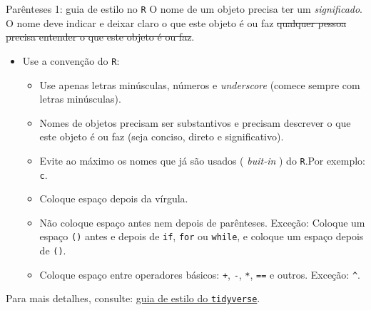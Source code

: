 \documentclass[
  10pt,
  ignorenonframetext,
]{beamer}
\providecommand{\tightlist}{%
  \setlength{\itemsep}{0pt}\setlength{\parskip}{0pt}}
\begin{document}
\begin{frame}[fragile]{Parênteses 1: guia de estilo no \texttt{R}}
\protect\hypertarget{paruxeanteses-1-guia-de-estilo-no-r}{}
O nome de um objeto precisa ter um \emph{significado}. O nome deve
indicar e deixar claro o que este objeto é ou faz \sout{qualquer pessoa
precisa entender o que este objeto é ou faz}.

\begin{itemize}
\tightlist
\item
  Use a convenção do \texttt{R}:

  \begin{itemize}
  \tightlist
  \item
    Use apenas letras minúsculas, números e \emph{underscore} (comece
    sempre com letras minúsculas).
  \item
    Nomes de objetos precisam ser substantivos e precisam descrever o
    que este objeto é ou faz (seja conciso, direto e significativo).
  \item
    Evite ao máximo os nomes que já são usados ( \emph{buit-in} ) do
    \texttt{R}.Por exemplo: \texttt{c}.
  \item
    Coloque espaço depois da vírgula.
  \item
    Não coloque espaço antes nem depois de parênteses. Exceção: Coloque
    um espaço \texttt{()} antes e depois de \texttt{if}, \texttt{for} ou
    \texttt{while}, e coloque um espaço depois de \texttt{()}.
  \item
    Coloque espaço entre operadores básicos: \texttt{+}, \texttt{-},
    \texttt{*}, \texttt{==} e outros. Exceção: \texttt{\^{}}.
  \end{itemize}
\end{itemize}

Para mais detalhes, consulte: \href{https://style.tidyverse.org}{guia de
estilo do \texttt{tidyverse}}.
\end{frame}
\end{document}
